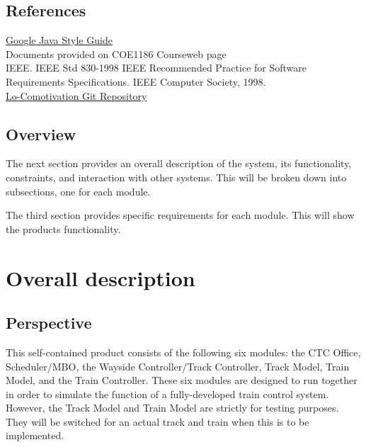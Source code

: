 \documentclass[11pt]{article}
\begin{document}
\subsection{References}
\label{sec-1-4}

\noindent
\href{https://google.github.io/styleguide/javaguide.html}{Google Java Style Guide} \\

\noindent
Documents provided on COE1186 Courseweb page \\

\noindent
IEEE. IEEE Std 830-1998 IEEE Recommended Practice for Software Requirements Specifications. IEEE Computer Society, 1998. \\

\noindent
\href{https://github.com/michaelghaben/ece1186}{Lo-Comotivation Git Repository}

\subsection{Overview}
\label{sec-1-5}
The next section provides an overall description of the system, its functionality, constraints, and interaction with other systems. This will be broken down into subsections, one for each module. 

The third section provides specific requirements for each module. This will show the products functionality.

\section{Overall description}
\label{sec-2}
\subsection{Perspective}
\label{sec-2-1}
This self-contained product consists of the following six modules: the CTC Office, Scheduler/MBO, the Wayside Controller/Track Controller, Track Model, Train Model, and the Train Controller. These six modules are designed to run together in order to simulate the function of a fully-developed train control system. However, the Track Model and Train Model are strictly for testing purposes. They will be switched for an actual track and train when this is to be implemented. 
\end{document}
